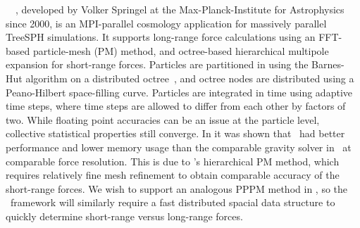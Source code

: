 \documentclass[11pt,letterpaper]{article}
\begin{document}
\SUBSUBSECTION{\gadget}
%
\gadget~\cite{wwwgadget}~\cite{Sp05}, developed by Volker Springel at
the Max-Planck-Institute for Astrophysics since 2000, is an
MPI-parallel cosmology application for massively parallel TreeSPH
simulations.  It supports long-range force calculations using an
FFT-based particle-mesh (PM) method, and octree-based hierarchical
multipole expansion for short-range forces.
%
Particles are partitioned in  using the Barnes-Hut
algorithm on a distributed octree~\cite{BaHu86}, and octree nodes are
distributed using a Peano-Hilbert space-filling curve.  Particles are
integrated in time using adaptive time steps, where time steps are
allowed to differ from each other by factors of two.
%
While floating point accuracies can be an issue at the particle level,
collective statistical properties still converge.  In \cite{OsNa05} it
was shown that \gadget\ had better performance and lower memory usage
than the comparable gravity solver in \enzo\ at comparable force
resolution.  This is due to \enzo's hierarchical PM method, which
requires relatively fine mesh refinement to obtain comparable accuracy
of the short-range forces.
%
We wish to support an analogous PPPM method in \enzoii, so the \cello\
framework will similarly require a fast distributed spacial data
structure to quickly determine short-range versus long-range forces.
\end{document}

